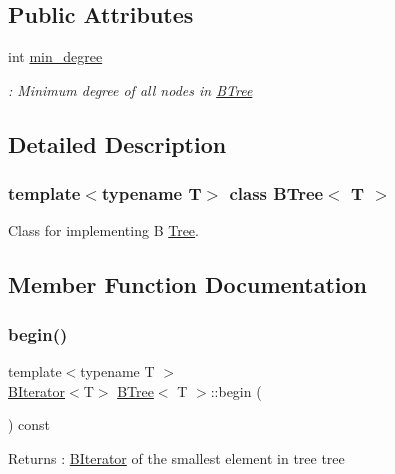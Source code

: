 \subsection*{Public Attributes}
\begin{DoxyCompactItemize}
\item 
\mbox{\label{classBTree_a67674b9ddf809c4f518185888f0918e4}} 
int \hyperlink{classBTree_a67674b9ddf809c4f518185888f0918e4}{min\+\_\+degree}
\begin{DoxyCompactList}\small\item\em \+: Minimum degree of all nodes in \hyperlink{classBTree}{B\+Tree} \end{DoxyCompactList}\end{DoxyCompactItemize}


\subsection{Detailed Description}
\subsubsection*{template$<$typename T$>$\newline
class B\+Tree$<$ T $>$}

Class for implementing B \hyperlink{classTree}{Tree}. 

\subsection{Member Function Documentation}
\mbox{\label{classBTree_aae48f3719f14f2170641cf204a9d531c}} 
\subsubsection{\texorpdfstring{begin()}{begin()}}
{\footnotesize\ttfamily template$<$typename T $>$ \\
\hyperlink{classBIterator}{B\+Iterator}$<$T$>$ \hyperlink{classBTree}{B\+Tree}$<$ T $>$\+::begin (\begin{DoxyParamCaption}{ }\end{DoxyParamCaption}) const\hspace{0.3cm}{\ttfamily [noexcept]}}

\begin{DoxyReturn}{Returns}
\+: \hyperlink{classBIterator}{B\+Iterator} of the smallest element in tree tree 
\end{DoxyReturn}
\mbox{\label{classBTree_a3115f4378da1a0fd49e73a5dbecf9822}} 

